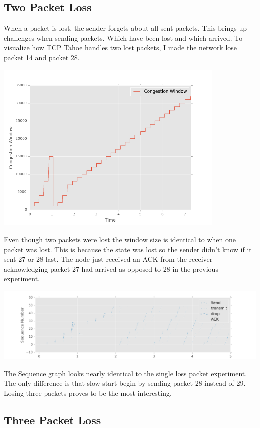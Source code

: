 \documentclass[fleqn,11pt]{article}
\begin{document}
\subsection{Two Packet Loss}

When a packet is lost, the sender forgets about all sent packets. 
This brings up challenges when sending packets. Which have been lost and which arrived.
To visualize how TCP Tahoe handles two lost packets, I made the network lose packet 14 and packet 28.

\includegraphics[width=11cm]{graphs/cwnd1428.png}

Even though two packets were lost the window size is identical to when one packet was lost.
This is because the state was lost so the sender didn't know if it sent 27 or 28 last.
The node just received an ACK from the receiver acknowledging packet 27 had arrived as opposed to 28 in the previous experiment. 

\includegraphics[width=16cm]{graphs/sequence1428.png}

The Sequence graph looks nearly identical to the single loss packet experiment. 
The only difference is that slow start begin by sending packet 28 instead of 29. 
Losing three packets proves to be the most interesting.

\subsection{Three Packet Loss}
\end{document}
